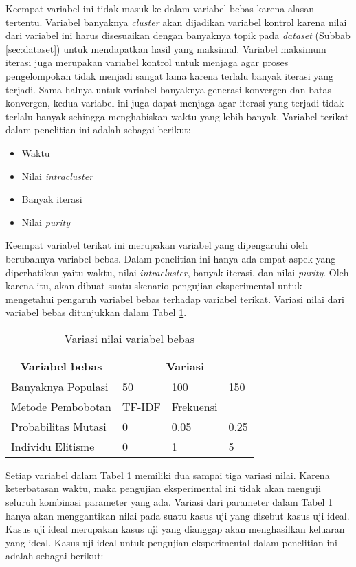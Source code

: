 Keempat variabel ini tidak masuk ke dalam variabel bebas karena alasan tertentu. Variabel banyaknya \textit{cluster} akan dijadikan variabel kontrol karena nilai dari variabel ini harus disesuaikan dengan banyaknya topik pada \textit{dataset} (Subbab \ref{sec:dataset}) untuk mendapatkan hasil yang maksimal. Variabel maksimum iterasi juga merupakan variabel kontrol untuk menjaga agar proses pengelompokan tidak menjadi sangat lama karena terlalu banyak iterasi yang terjadi. Sama halnya untuk variabel banyaknya generasi konvergen dan batas konvergen, kedua variabel ini juga dapat menjaga agar iterasi yang terjadi tidak terlalu banyak sehingga menghabiskan waktu yang lebih banyak. Variabel terikat dalam penelitian ini adalah sebagai berikut:

\begin{itemize}
	\item Waktu
	\item Nilai \textit{intracluster}
	\item Banyak iterasi
	\item Nilai \textit{purity}
\end{itemize}

Keempat variabel terikat ini merupakan variabel yang dipengaruhi oleh berubahnya variabel bebas. Dalam penelitian ini hanya ada empat aspek yang diperhatikan yaitu waktu, nilai \textit{intracluster}, banyak iterasi, dan nilai \textit{purity}. Oleh karena itu, akan dibuat suatu skenario pengujian eksperimental untuk mengetahui pengaruh variabel bebas terhadap variabel terikat. Variasi nilai dari variabel bebas ditunjukkan dalam Tabel \ref{tbl:testScenario}.

\begin{table}[H]
	\centering
	\begin{tabular}{|l|l l l|} \hline
		\multicolumn{1}{|c|}{Variabel bebas} & \multicolumn{3}{c|}{Variasi} \\ \hline
		Banyaknya Populasi & 50 & 100 & 150 \\ \hline
		Metode Pembobotan & TF-IDF & Frekuensi &  \\ \hline
		Probabilitas Mutasi & 0 & 0.05 & 0.25 \\ \hline
		Individu Elitisme & 0 & 1 & 5 \\ \hline
	\end{tabular}
	\caption{Variasi nilai variabel bebas}
	\label{tbl:testScenario}
\end{table}

Setiap variabel dalam Tabel \ref{tbl:testScenario} memiliki dua sampai tiga variasi nilai. Karena keterbatasan waktu, maka pengujian eksperimental ini tidak akan menguji seluruh kombinasi parameter yang ada. Variasi dari parameter dalam Tabel \ref{tbl:testScenario} hanya akan menggantikan nilai pada suatu kasus uji yang disebut kasus uji ideal. Kasus uji ideal merupakan kasus uji yang dianggap akan menghasilkan keluaran yang ideal. Kasus uji ideal untuk pengujian eksperimental dalam penelitian ini adalah sebagai berikut:

